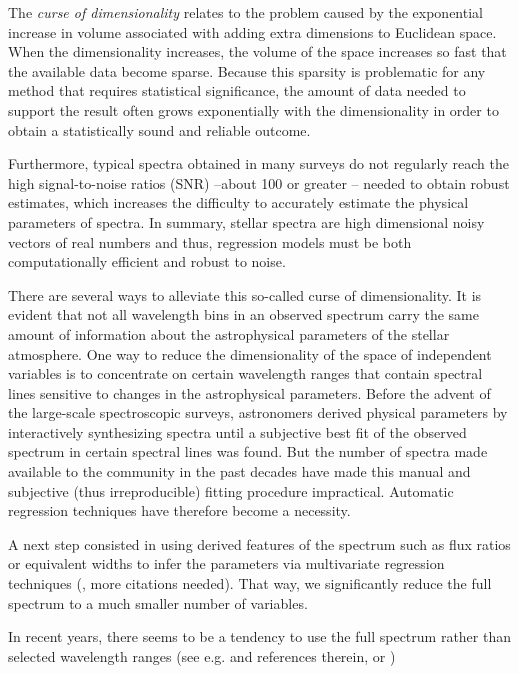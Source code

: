 \documentclass[a4paper,fleqn,usenatbib]{mnras}
\begin{document}
The \textit{curse of dimensionality} \citep{bellman:61} relates to 
the problem caused by the exponential increase in volume associated 
with adding extra dimensions to Euclidean space. 
When the dimensionality increases, the volume of the space increases so 
fast that the available data become sparse. Because this sparsity is 
problematic for any method that requires statistical significance, the 
amount of data needed to support the result often grows exponentially 
with the dimensionality in order to obtain a statistically sound and 
reliable outcome.

Furthermore, typical spectra obtained in many surveys do not 
regularly reach the high signal-to-noise ratios (SNR) --about
100 or greater -- needed to obtain robust estimates, which
increases the difficulty to accurately estimate the physical
parameters of spectra.  In summary, stellar spectra are high
dimensional noisy vectors of real numbers and thus,
regression models must be both computationally efficient and robust
to noise.

There are several ways to alleviate this so-called curse of
dimensionality. It is evident that not all wavelength bins in an
observed spectrum carry the same amount of information about the
astrophysical parameters of the stellar atmosphere. One way to reduce
the dimensionality of the space of independent variables is to
concentrate on certain wavelength ranges that contain spectral lines
sensitive to changes in the astrophysical parameters. Before the
advent of the large-scale spectroscopic surveys, astronomers derived
physical parameters by interactively synthesizing spectra until a
subjective best fit of the observed spectrum in certain spectral lines
was found. But the number of spectra made available to the community
in the past decades have made this manual and subjective (thus
irreproducible) fitting procedure impractical. Automatic regression
techniques have therefore become a necessity.

A next step consisted in using derived features of the spectrum such
as flux ratios or equivalent widths to infer the parameters via
multivariate regression techniques (\cite{2006ApJ...636..804A}, more
citations needed). That way, we significantly reduce the full spectrum
to a much smaller number of variables.

In recent years, there seems to be a tendency to use the full spectrum
rather than selected wavelength ranges (see
e.g. \cite{2014A&A...567A...5R} and references therein,
\cite{2015ApJ...808...16N} or \cite{})
\end{document}

